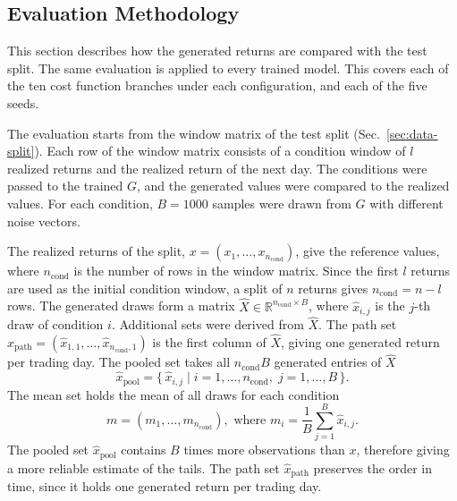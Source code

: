 \subsection{Evaluation Methodology}\label{sec:evaluation}
This section describes how the generated returns are compared with the test split. The same evaluation is applied to every trained model. This covers each of the ten cost function branches under each configuration, and each of the five seeds. 

The evaluation starts from the window matrix of the test split (Sec.~\ref{sec:data-split}). Each row of the window matrix consists of a condition window of $l$ realized returns and the realized return of the next day. The conditions were passed to the trained $G$, and the generated values were compared to the realized values. For each condition, $B=\num{1000}$ samples were drawn from $G$ with different noise vectors. 

The realized returns of the split, $x = (x_1, \ldots, x_{n_{\mathrm{cond}}})$, give the reference values, where $n_{\mathrm{cond}}$ is the number of rows in the window matrix. Since the first $l$ returns are used as the initial condition window, a split of $n$ returns gives $n_{\mathrm{cond}} = n - l$ rows. The generated draws form a matrix $\hat{X} \in \mathbb{R}^{n_{\mathrm{cond}} \times B}$, where $\hat{x}_{i,j}$ is the $j$-th draw of condition $i$. Additional sets were derived from $\hat{X}$. The path set $\hat{x}_{\mathrm{path}} = (\hat{x}_{1,1}, \ldots, \hat{x}_{n_{\mathrm{cond}},1})$ is the first column of $\hat{X}$, giving one generated return per trading day. The pooled set takes all $n_{\mathrm{cond}}B$ generated entries of $\hat{X}$
\begin{equation}
    \hat{x}_{\mathrm{pool}} = \{\, \hat{x}_{i,j} \;|\;
    i = 1, \ldots, n_{\mathrm{cond}}, \; j = 1, \ldots, B \,\}.
\end{equation}
The mean set holds the mean of all draws for each condition
\begin{equation}
    m = (m_1, \ldots, m_{n_{\mathrm{cond}}}), 
    \text{ where }
    m_i = \frac{1}{B} \sum_{j=1}^{B} \hat{x}_{i,j}.
\end{equation}
The pooled set $\hat{x}_{\mathrm{pool}}$ contains $B$ times more observations than $x$, therefore giving a more reliable estimate of the tails. The path set $\hat{x}_{\mathrm{path}}$ preserves the order in time, since it holds one generated return per trading day.

